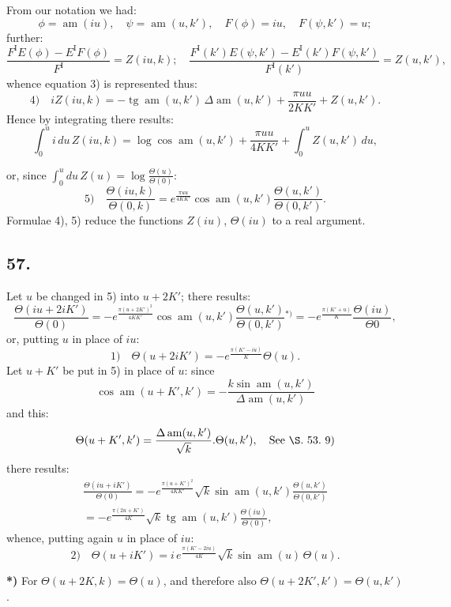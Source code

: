 \documentclass{article}
\begin{document}
From our notation we had:
\[
\phi=\operatorname{am}(iu),\quad \psi=\operatorname{am}(u,k'),\quad F(\phi)=iu,\quad F(\psi,k')=u;
\]
further:
\[
\frac{F^{\mathrm{I}}E(\phi)-E^{\mathrm{I}}F(\phi)}{F^{\mathrm{I}}}=Z(iu,k);\quad \frac{F^{\mathrm{I}}(k')E(\psi,k')-E^{\mathrm{I}}(k')F(\psi,k')}{F^{\mathrm{I}}(k')}=Z(u,k'),
\]
whence equation 3) is represented thus:
\[
\text{4)}\quad iZ(iu,k)=-\operatorname{tg}\operatorname{am}(u,k')\,\Delta\operatorname{am}(u,k')+\frac{\pi uu}{2KK'}+Z(u,k').
\]
Hence by integrating there results:
\[
\int_{0}^{u}i\,du\,Z(iu,k)=\log\cos\operatorname{am}(u,k')+\frac{\pi uu}{4KK'}+\int_{0}^{u}Z(u,k')\,du,
\]

or, since $\displaystyle\int_{0}^{u}du\,Z(u)=\log\frac{\Theta(u)}{\Theta(0)}$:
\[
\text{5)}\quad \frac{\Theta(iu,k)}{\Theta(0,k)}=e^{\frac{\pi uu}{4KK'}}\cos\operatorname{am}(u,k')\frac{\Theta(u,k')}{\Theta(0,k')}.
\]
Formulae 4), 5) reduce the functions $Z(iu)$, $\Theta(iu)$ to a real argument.

\subsection*{57.}

Let $u$ be changed in 5) into $u+2K'$; there results:
\[
\frac{\Theta(iu+2iK')}{\Theta(0)}=-e^{\frac{\pi(u+2K')^{2}}{4KK'}}\cos\operatorname{am}(u,k')\frac{\Theta(u,k')}{\Theta(0,k')}{}^{*)}=-e^{\frac{\pi(K'+u)}{K}}\frac{\Theta(iu)}{\Theta 0},
\]
or, putting $u$ in place of $iu$:
\[
\text{1)}\quad \Theta(u+2iK')=-e^{\frac{\pi(K'-iu)}{K}}\Theta(u).
\]
Let $u+K'$ be put in 5) in place of $u$: since
\[
\cos\operatorname{am}(u+K',k')=-\frac{k\sin\operatorname{am}(u,k')}{\Delta\operatorname{am}(u,k')}
\]
and this:
\[
\Theta(u+K',k')=\frac{\Delta\operatorname{am}(u,k')}{\sqrt{k}}.\Theta(u,k'),\quad\text{See }\S\text{.\ 53.\ 9)}
\]
there results:
\[
\begin{gathered}
\frac{\Theta(iu+iK')}{\Theta(0)}=-e^{\frac{\pi(u+K')^{2}}{4KK'}}\sqrt{k}\sin\operatorname{am}(u,k')\frac{\Theta(u,k')}{\Theta(0,k')}\\[1.5ex]
=-e^{\frac{\pi(2u+K')}{4K}}\sqrt{k}\operatorname{tg}\operatorname{am}(u,k')\frac{\Theta(iu)}{\Theta(0)},
\end{gathered}
\]
whence, putting again $u$ in place of $iu$:
\[
\text{2)}\quad \Theta(u+iK')=i\,e^{\frac{\pi(K'-2iu)}{4K}}\sqrt{k}\sin\operatorname{am}(u)\,\Theta(u).
\]

\textbf{*)} For $\Theta(u+2K,k)=\Theta(u)$, and therefore also $\Theta(u+2K',k')=\Theta(u,k')$.
\end{document}
